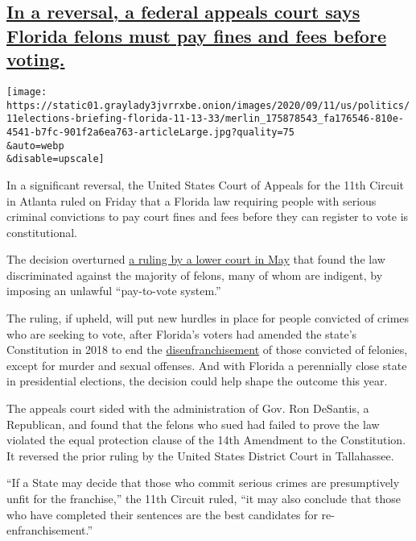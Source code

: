 \hypertarget{in-a-reversal-a-federal-appeals-court-says-florida-felons-must-pay-fines-and-fees-before-voting}{%
\subsection{\texorpdfstring{\protect\hyperlink{in-a-reversal-a-federal-appeals-court-says-florida-felons-must-pay-fines-and-fees-before-voting}{In
a reversal, a federal appeals court says Florida felons must pay fines
and fees before
voting.}}{In a reversal, a federal appeals court says Florida felons must pay fines and fees before voting.}}\label{in-a-reversal-a-federal-appeals-court-says-florida-felons-must-pay-fines-and-fees-before-voting}}

\texttt{[image: https://static01.graylady3jvrrxbe.onion/images/2020/09/11/us/politics/11elections-briefing-florida-11-13-33/merlin\_175878543\_fa176546-810e-4541-b7fc-901f2a6ea763-articleLarge.jpg?quality=75\\\&auto=webp\\\&disable=upscale]}

In a significant reversal, the United States Court of Appeals for the
11th Circuit in Atlanta ruled on Friday that a Florida law requiring
people with serious criminal convictions to pay court fines and fees
before they can register to vote is constitutional.

The decision overturned
\href{https://www.nytimes3xbfgragh.onion/2020/05/24/us/florida-felon-voting-court-judge-ruling.html}{a
ruling by a lower court in May} that found the law discriminated against
the majority of felons, many of whom are indigent, by imposing an
unlawful ``pay-to-vote system.''

The ruling, if upheld, will put new hurdles in place for people
convicted of crimes who are seeking to vote, after Florida's voters had
amended the state's Constitution in 2018 to end the
\href{https://www.nytimes3xbfgragh.onion/2018/05/11/us/voting-rights-felons.html}{disenfranchisement}
of those convicted of felonies, except for murder and sexual offenses.
And with Florida a perennially close state in presidential elections,
the decision could help shape the outcome this year.

The appeals court sided with the administration of Gov. Ron DeSantis, a
Republican, and found that the felons who sued had failed to prove the
law violated the equal protection clause of the 14th Amendment to the
Constitution. It reversed the prior ruling by the United States District
Court in Tallahassee.

``If a State may decide that those who commit serious crimes are
presumptively unfit for the franchise,'' the 11th Circuit ruled, ``it
may also conclude that those who have completed their sentences are the
best candidates for re-enfranchisement.''

